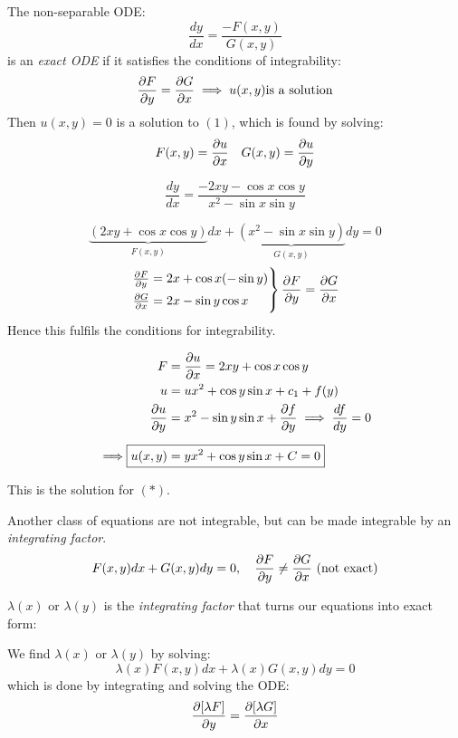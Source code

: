\documentclass[10pt]{scrartcl}
\begin{document}
\begin{definition}
	 The non-separable ODE: 
\[\frac{dy}{dx} = \frac{-F(x,y)}{G(x,y)}\tag{1}\]
is an \emph{exact ODE} if it satisfies the conditions of integrability: 
\[\dfrac{\partial F}{\partial y} = \dfrac{\partial G}{\partial x} \implies u(x,y)\text {is a solution}\]
Then $u(x,y) = 0$ is a solution to $(1)$, which is found by solving: 
\[F(x,y) = \frac{\partial u}{\partial x}\quad G(x,y) = \frac{\partial u}{\partial y}\]
\end{definition}\vspace*{5pt}


\begin{example}
\[\frac{dy}{dx} = \frac{-2xy-\cos x\cos y}{x^2-\sin x\sin y} \tag{$*$}\]	

\[\underbrace{(2xy + \cos x \cos y)}_{F(x,y)}dx + \underbrace{(x^2-\sin x\sin y)}_{G(x,y)}dy = 0\]
\[
\begin{aligned}
  \begin{rcases*}
  \frac{\del F}{\del y} = 2x + \cos x(-\sin y)\\
  \frac{\del G}{\del x} = 2x - \sin y \cos x	
  \end{rcases*}
  \frac{\del F}{\del y} = \frac{\del G}{\del x}
\end{aligned}
\]
Hence this fulfils the conditions for integrability. 

\[
\begin{aligned}
  F &= \frac{\del u}{\del x} = 2xy + \cos x \cos y\\
  u &= ux^2 + \cos y \sin x + c_1 + f(y)\\
  \frac{\del u}{\del y} &= x^2 - \sin y\sin x + \frac{\del f}{\del y} \implies \frac{df}{dy} = 0\\[0.2cm]
  \implies \Aboxed{u(x,y) &= yx^2 + \cos y\sin x + C = 0}
\end{aligned}
\]

This is the solution for $(*)$. 
\end{example}

Another class of equations are not integrable, but can be made integrable by an \emph{integrating factor}. 
\[F(x,y)dx + G(x,y)dy = 0, \quad  \frac{\partial F}{\partial y} \neq \frac{\partial G}{\partial x} \text{ (not exact)}\]

 \begin{definition}
	$\lambda(x)$ or $\lambda(y)$ is the \emph{integrating factor} that turns our equations into exact form: 
\end{definition}

We find $\lambda(x)$ or $\lambda(y)$ by solving:
\[\lambda(x)F(x,y)dx + \lambda(x)G(x,y)dy = 0\]
which is done by integrating and solving the ODE: 
\[\frac{\partial[\lambda F]}{\partial y} = \frac{\partial[\lambda G]}{\partial x}\]
\end{document}
